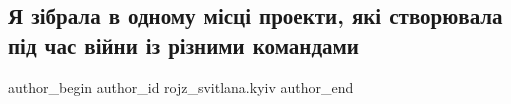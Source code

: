  
 
 
 
 

\subsection{Я зібрала в одному місці проекти, які створювала під час війни із різними командами}
\label{sec:08_02_2023.fb.rojz_svitlana.kyiv.1.ya_z_brala_v_odnomu_}

\ifcmt
 author_begin
   author_id rojz_svitlana.kyiv
 author_end
\fi
